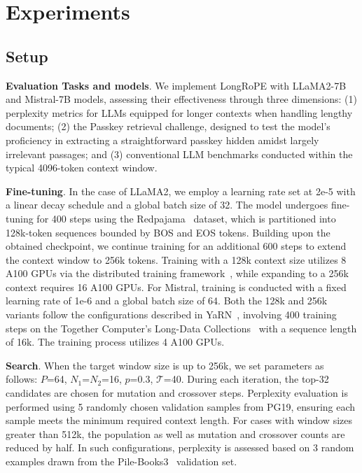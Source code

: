  \section{Experiments}

\label{sec:exp}
\subsection{Setup}
\textbf{Evaluation Tasks and models}. We implement LongRoPE with LLaMA2-7B and Mistral-7B models, assessing their effectiveness through three dimensions: (1) perplexity metrics for LLMs equipped for longer contexts when handling lengthy documents; (2) the Passkey retrieval challenge, designed to test the model's proficiency in extracting a straightforward passkey hidden amidst largely irrelevant passages; and (3) conventional LLM benchmarks conducted within the typical 4096-token context window.

\textbf{Fine-tuning}. In the case of LLaMA2, we employ a learning rate set at 2e-5 with a linear decay schedule and a global batch size of 32. The model undergoes fine-tuning for 400 steps using the Redpajama~\cite{redpajama} dataset, which is partitioned into 128k-token sequences bounded by BOS and EOS tokens. Building upon the obtained checkpoint, we continue training for an additional 600 steps to extend the context window to 256k tokens. Training with a 128k context size utilizes 8 A100 GPUs via the distributed training framework~\cite{cube}, while expanding to a 256k context requires 16 A100 GPUs. For Mistral, training is conducted with a fixed learning rate of 1e-6 and a global batch size of 64. Both the 128k and 256k variants follow the configurations described in YaRN~\cite{yarn}, involving 400 training steps on the Together Computer's Long-Data Collections~\cite{mistraldata} with a sequence length of 16k. The training process utilizes 4 A100 GPUs.

\textbf{Search}. When the target window size is up to 256k, we set parameters as follows: $P$=64, $N_1$=$N_2$=16, $p$=0.3, $\mathcal{T}$=40. During each iteration, the top-32 candidates are chosen for mutation and crossover steps. Perplexity evaluation is performed using 5 randomly chosen validation samples from PG19, ensuring each sample meets the minimum required context length. For cases with window sizes greater than 512k, the population as well as mutation and crossover counts are reduced by half. In such configurations, perplexity is assessed based on 3 random examples drawn from the Pile-Books3~\cite{pile} validation set.

